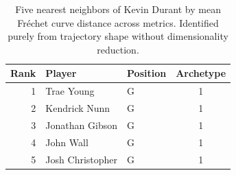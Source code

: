\begin{table}[htbp]
  \centering\small
  \begin{tabular}{rllc}
    \toprule
    Rank & Player & Position & Archetype \\
    \midrule
    1 & Trae Young & G & 1 \\
    2 & Kendrick Nunn & G & 1 \\
    3 & Jonathan Gibson & G & 1 \\
    4 & John Wall & G & 1 \\
    5 & Josh Christopher & G & 1 \\
    \bottomrule
  \end{tabular}
  \caption{Five nearest neighbors of Kevin Durant by mean Fr\'{e}chet curve distance across metrics. Identified purely from trajectory shape without dimensionality reduction.}
  \label{tab:Kevin_Durant_frechet_curve_neighbors}
\end{table}

